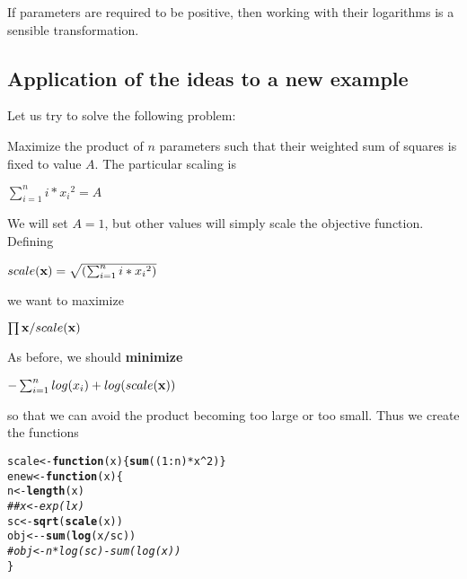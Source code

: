 \documentclass[11pt]{article}\usepackage[]{graphicx}\usepackage[]{color}
\makeatletter
\newcommand{\hlnum}[1]{\textcolor[rgb]{0.686,0.059,0.569}{#1}}%
\newcommand{\hlcom}[1]{\textcolor[rgb]{0.678,0.584,0.686}{\textit{#1}}}%
\newcommand{\hlopt}[1]{\textcolor[rgb]{0,0,0}{#1}}%
\newcommand{\hlstd}[1]{\textcolor[rgb]{0.345,0.345,0.345}{#1}}%
\newcommand{\hlkwa}[1]{\textcolor[rgb]{0.161,0.373,0.58}{\textbf{#1}}}%
\newcommand{\hlkwb}[1]{\textcolor[rgb]{0.69,0.353,0.396}{#1}}%
\newcommand{\hlkwc}[1]{\textcolor[rgb]{0.333,0.667,0.333}{#1}}%
\newcommand{\hlkwd}[1]{\textcolor[rgb]{0.737,0.353,0.396}{\textbf{#1}}}%
\newenvironment{kframe}{%
 \def\at@end@of@kframe{}%
 \ifinner\ifhmode%
  \def\at@end@of@kframe{\end{minipage}}%
  \begin{minipage}{\columnwidth}%
 \fi\fi%
 \def\FrameCommand##1{\hskip\@totalleftmargin \hskip-\fboxsep
 \colorbox{shadecolor}{##1}\hskip-\fboxsep
     \hskip-\linewidth \hskip-\@totalleftmargin \hskip\columnwidth}%
 \MakeFramed {\advance\hsize-\width
   \@totalleftmargin\z@ \linewidth\hsize
   \@setminipage}}%
 {\par\unskip\endMakeFramed%
 \at@end@of@kframe}
\newenvironment{knitrout}{}{} %
\newcommand{\B}[1]{{\bf #1 \rm}}
\makeatother
\begin{document}
If parameters are required to be positive, then working with their logarithms
is a sensible transformation.

\subsection{Application of the ideas to a new example}

Let us try to solve the following problem:

Maximize the product of $n$ parameters such that their weighted sum of squares is fixed to value $A$.
The particular scaling is

\vspace{2mm}
$\sum_{i=1}^n{i*{x_i}^2} = A $
\vspace{2mm}

We will set $A = 1$, but other values will simply scale the objective function.
Defining 

\vspace{2mm}
$ scale({\B{x})} = \sqrt{(\sum_{i=1}^n{i*{x_i}^2})}  $
\vspace{2mm}

we want to maximize 

\vspace{2mm}
$ \prod{\B{x}} / scale({\B{x})} $
\vspace{2mm}

As before, we should \B{minimize}

\vspace{2mm}
$  - \sum_{i=1}^n{log(x_i)} + log(scale({\B{x})}) $
\vspace{2mm}

so that we can avoid the product becoming too large or too small. Thus we create the functions


\begin{knitrout}\scriptsize
{}\color{fgcolor}\begin{kframe}
\begin{alltt}
\hlstd{scale} \hlkwb{<-} \hlkwa{function}\hlstd{(}\hlkwc{x}\hlstd{) \{}\hlkwd{sum}\hlstd{( (}\hlnum{1}\hlopt{:}\hlstd{n)} \hlopt{*} \hlstd{x}\hlopt{^}\hlnum{2}\hlstd{)\}}
\hlstd{enew} \hlkwb{<-} \hlkwa{function}\hlstd{(}\hlkwc{x}\hlstd{)\{}
  \hlstd{n} \hlkwb{<-} \hlkwd{length}\hlstd{(x)}
\hlcom{##  x <- exp(lx)}
  \hlstd{sc} \hlkwb{<-} \hlkwd{sqrt}\hlstd{(}\hlkwd{scale}\hlstd{(x))}
  \hlstd{obj} \hlkwb{<-} \hlopt{-} \hlkwd{sum}\hlstd{(}\hlkwd{log}\hlstd{(x}\hlopt{/}\hlstd{sc))}
\hlcom{#  obj <- n*log(sc)-sum(log(x))}
\hlstd{\}}
\end{alltt}
\end{kframe}
\end{knitrout}
\end{document}
